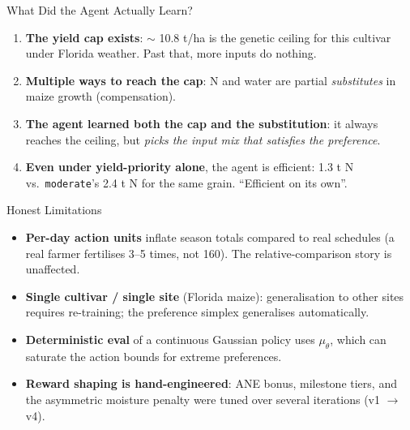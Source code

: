 \documentclass[10pt,aspectratio=169]{beamer}
\begin{document}
\begin{frame}{What Did the Agent Actually Learn?}
  \begin{enumerate}
    \item \textbf{The yield cap exists}: $\sim$ 10.8 t/ha is the genetic ceiling for this cultivar
      under Florida weather. Past that, more inputs do nothing.
    \item \textbf{Multiple ways to reach the cap}: N and water are partial \emph{substitutes}
      in maize growth (compensation).
    \item \textbf{The agent learned both the cap and the substitution}: it always reaches the
      ceiling, but \emph{picks the input mix that satisfies the preference}.
    \item \textbf{Even under yield-priority alone}, the agent is efficient: 1.3 t N vs.\
      \texttt{moderate}'s 2.4 t N for the same grain. ``Efficient on its own''.
  \end{enumerate}
\end{frame}

\begin{frame}{Honest Limitations}
  \begin{itemize}
    \item \textbf{Per-day action units} inflate season totals compared to real schedules
      (a real farmer fertilises 3--5 times, not 160). The relative-comparison story is unaffected.
    \item \textbf{Single cultivar / single site} (Florida maize): generalisation to other sites
      requires re-training; the preference simplex generalises automatically.
    \item \textbf{Deterministic eval} of a continuous Gaussian policy uses $\mu_\theta$, which
      can saturate the action bounds for extreme preferences.
    \item \textbf{Reward shaping is hand-engineered}: ANE bonus, milestone tiers, and the
      asymmetric moisture penalty were tuned over several iterations (v1 $\to$ v4).
  \end{itemize}
\end{frame}
\end{document}
